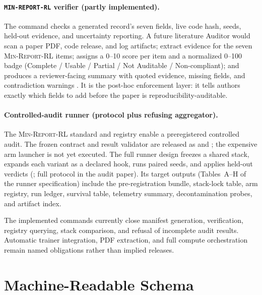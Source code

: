 \documentclass[11pt]{article}
\newcommand{\minreport}{\textsc{Min-Report-RL}}
\begin{document}
\paragraph{\texttt{MIN-REPORT-RL} verifier (partly implemented).} The
 command checks a generated
record's seven fields, live code hash, seeds, held-out evidence, and uncertainty
reporting. A future literature Auditor would scan a paper PDF, code release,
and log artifacts; extract evidence
for the seven \minreport{} items; assigns a 0--10 score per item and a
normalized 0--100 badge (Complete / Usable / Partial / Not Auditable /
Non-compliant); and produces a reviewer-facing summary with quoted evidence,
missing fields, and contradiction warnings \cite{zvfaudit2026}. It is the
post-hoc enforcement layer: it tells authors exactly which fields to add before
the paper is reproducibility-auditable.

\paragraph{Controlled-audit runner (protocol plus refusing aggregator).} The
\minreport{} standard and registry enable a preregistered controlled audit.
The frozen contract and result validator are released as
 and
; the expensive arm launcher is not
yet executed. The full runner design freezes a shared stack, expands each
variant as a declared hook, runs paired seeds, and applies held-out verdicts
(\cite{zvfaudit2026}; full protocol in the audit paper). Its target outputs
(Tables~A--H of the runner specification) include the pre-registration bundle,
stack-lock table, arm registry, run ledger, survival table, telemetry summary,
decontamination probes, and artifact index.

The implemented commands currently close manifest generation, verification,
registry querying, stack comparison, and refusal of incomplete audit results.
Automatic trainer integration, PDF extraction, and full compute orchestration
remain named obligations rather than implied releases.

\section{Machine-Readable Schema}
\label{sec:json}
\end{document}
